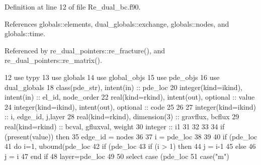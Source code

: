 Definition at line 12 of file Re\+\_\+dual\+\_\+bc.\+f90.



References globals\+::elements, dual\+\_\+globals\+::exchange, globals\+::nodes, and globals\+::time.



Referenced by re\+\_\+dual\+\_\+pointers\+::re\+\_\+fracture(), and re\+\_\+dual\+\_\+pointers\+::re\+\_\+matrix().


\begin{DoxyCode}
12       \textcolor{keywordtype}{use }typy
13       \textcolor{keywordtype}{use }globals
14       \textcolor{keywordtype}{use }global_objs
15       \textcolor{keywordtype}{use }pde_objs
16       \textcolor{keywordtype}{use }dual_globals
18       \textcolor{keywordtype}{class}(pde_str), \textcolor{keywordtype}{intent(in)} :: pde\_loc 
20       \textcolor{keywordtype}{integer(kind=ikind)}, \textcolor{keywordtype}{intent(in)}  :: el\_id, node\_order
22       \textcolor{keywordtype}{real(kind=rkind)}, \textcolor{keywordtype}{intent(out)}, \textcolor{keywordtype}{optional}    :: value
24       \textcolor{keywordtype}{integer(kind=ikind)}, \textcolor{keywordtype}{intent(out)}, \textcolor{keywordtype}{optional} :: code
25      
26 
27       \textcolor{keywordtype}{integer(kind=ikind)} :: i, edge\_id, j,layer
28       \textcolor{keywordtype}{real(kind=rkind)}, \textcolor{keywordtype}{dimension(3)} :: gravflux, bcflux
29       \textcolor{keywordtype}{real(kind=rkind)} :: bcval, gfluxval, weight
30       \textcolor{keywordtype}{integer} :: i1
31       
32       
33 
34       \textcolor{keywordflow}{if} (\textcolor{keyword}{present}(\textcolor{keywordtype}{value})) \textcolor{keywordflow}{then}
35         edge\_id = nodes%
36 
37         i = pde\_loc%
38         
39 
40         \textcolor{keywordflow}{if} (pde\_loc%
41           \textcolor{keywordflow}{do} i=1, ubound(pde\_loc%
42             \textcolor{keywordflow}{if} (pde\_loc%
43               \textcolor{keywordflow}{if} (i > 1) \textcolor{keywordflow}{then}
44                 j = i-1
45               \textcolor{keywordflow}{else}
46                 j = i
47 \textcolor{keywordflow}{              end if}
48               layer=pde\_loc%
49                
50               \textcolor{keywordflow}{select case} (pde\_loc%
51                 \textcolor{keywordflow}{case}(\textcolor{stringliteral}{"m"})

\end{DoxyCode}
